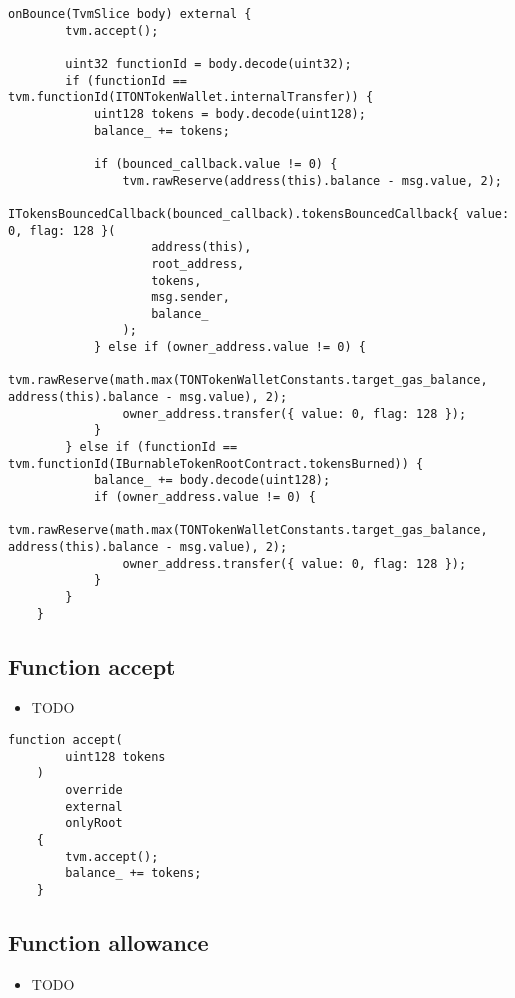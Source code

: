 \begin{lstlisting}[firstnumber=653]
    onBounce(TvmSlice body) external {
        tvm.accept();

        uint32 functionId = body.decode(uint32);
        if (functionId == tvm.functionId(ITONTokenWallet.internalTransfer)) {
            uint128 tokens = body.decode(uint128);
            balance_ += tokens;

            if (bounced_callback.value != 0) {
                tvm.rawReserve(address(this).balance - msg.value, 2);
                ITokensBouncedCallback(bounced_callback).tokensBouncedCallback{ value: 0, flag: 128 }(
                    address(this),
                    root_address,
                    tokens,
                    msg.sender,
                    balance_
                );
            } else if (owner_address.value != 0) {
                tvm.rawReserve(math.max(TONTokenWalletConstants.target_gas_balance, address(this).balance - msg.value), 2);
                owner_address.transfer({ value: 0, flag: 128 });
            }
        } else if (functionId == tvm.functionId(IBurnableTokenRootContract.tokensBurned)) {
            balance_ += body.decode(uint128);
            if (owner_address.value != 0) {
                tvm.rawReserve(math.max(TONTokenWalletConstants.target_gas_balance, address(this).balance - msg.value), 2);
                owner_address.transfer({ value: 0, flag: 128 });
            }
        }
    }
\end{lstlisting}

\subsection{Function accept}

\noindent\begin{itemize}
\item TODO
\end{itemize}

\begin{lstlisting}[firstnumber=96]
    function accept(
        uint128 tokens
    )
        override
        external
        onlyRoot
    {
        tvm.accept();
        balance_ += tokens;
    }
\end{lstlisting}

\subsection{Function allowance}

\noindent\begin{itemize}
\item TODO
\end{itemize}

